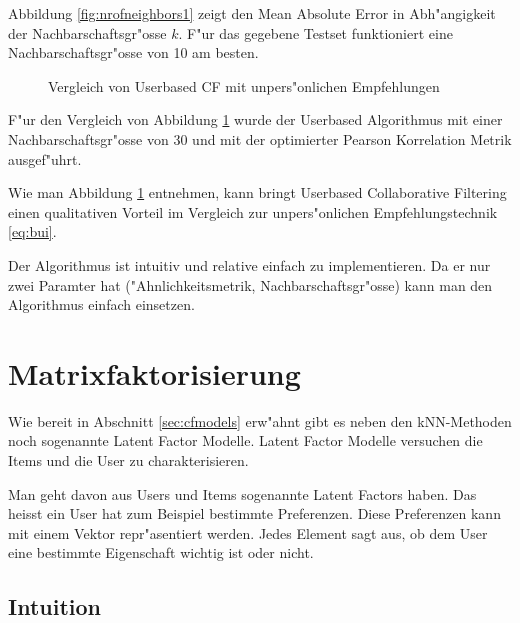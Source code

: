 \documentclass[a4paper, 12pt]{article}
\begin{document}
Abbildung \ref{fig:nrofneighbors1} zeigt den Mean Absolute Error in Abh"angigkeit der Nachbarschaftsgr"osse $k$. F"ur das gegebene Testset funktioniert eine Nachbarschaftsgr"osse von 10 am besten.

\begin{figure}
  \centering
{}

\caption{Vergleich von Userbased CF mit unpers"onlichen Empfehlungen}
\label{fig:uuvsbui}
\end{figure}

F"ur den Vergleich von Abbildung \ref{fig:uuvsbui} wurde der Userbased Algorithmus mit einer Nachbarschaftsgr"osse von 30 und mit der optimierter Pearson Korrelation Metrik ausgef"uhrt. 

Wie man Abbildung \ref{fig:uuvsbui} entnehmen, kann bringt Userbased Collaborative Filtering einen qualitativen Vorteil im Vergleich zur unpers"onlichen Empfehlungstechnik \ref{eq:bui}. 

Der Algorithmus ist intuitiv und relative einfach zu implementieren. Da er nur zwei Paramter hat ("Ahnlichkeitsmetrik, Nachbarschaftsgr"osse) kann man den Algorithmus einfach einsetzen. 

\section{Matrixfaktorisierung}
\label{sec:matrixfactorization}

Wie bereit in Abschnitt \ref{sec:cfmodels} erw"ahnt gibt es neben den kNN-Methoden noch sogenannte Latent Factor Modelle. Latent Factor Modelle versuchen die Items und die User zu charakterisieren. 

Man geht davon aus Users und Items sogenannte Latent Factors haben. Das heisst ein User hat zum Beispiel bestimmte Preferenzen. Diese Preferenzen kann mit einem Vektor repr"asentiert werden. Jedes Element sagt aus, ob dem User eine bestimmte Eigenschaft wichtig ist oder nicht. 


\subsection{Intuition}
\label{sec:intuition}
\end{document}
